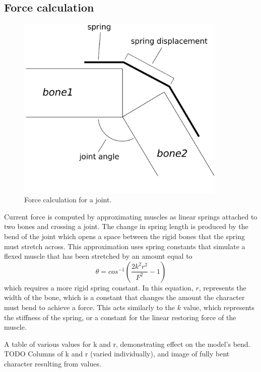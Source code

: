 \subsection{Force calculation}
\begin{figure}[ht]
	\centering
	\includegraphics[width=10cm]{images/spring_calc/spring_angle_calc.eps}
	\caption[Diagram of joint force calculation]{Force calculation for a joint.}
	\label{fig:forceCalc}
\end{figure}
Current force is computed by approximating muscles as linear springs attached to two bones and crossing a joint.  The change in spring length is produced by the bend of the joint which opens a space between the rigid bones that the spring must stretch across.  This approximation uses spring constants that simulate a flexed muscle that has been stretched by an amount equal to \[\theta = cos^{-1} \left( \dfrac{2 k^2 r^2}{F^2} - 1 \right)\] which requires a more rigid spring constant.  In this equation, $r$, represents the width of the bone, which is a constant that changes the amount the character must bend to achieve a force.  This acts similarly to the $k$ value, which represents the stiffness of the spring, or a constant for the linear restoring force of the muscle.  
\begin{table}[ht]
	\centering
	\caption[Table of spring muscle constants]{A table of various values for k and r, demonstrating effect on the model's bend.  TODO Columns of k and r (varied individually), and image of fully bent character resulting from values.}
	\label{tab:variedSpringValues}
\end{table}

